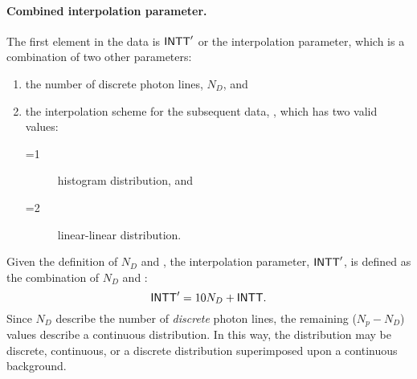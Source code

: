 \paragraph{Combined interpolation parameter.}\label{par:INTT}
The first element in the data is $\textsf{INTT}'$ or the interpolation parameter, which is a combination of two other parameters:
\begin{enumerate}
  \item the number of discrete photon lines, $N_{D}$, and
  \item the interpolation scheme for the subsequent data, , which has two valid values:
    \begin{description}
      \item[=1] histogram distribution, and
      \item[=2] linear-linear distribution.
    \end{description}
\end{enumerate}
Given the definition of $N_{D}$ and , the interpolation parameter, $\textsf{INTT}'$, is defined as the combination of $N_{D}$ and :
\begin{equation}
  \textsf{INTT}' = 10N_{D}+\textsf{INTT}.
  \label{eq::INTT'}
\end{equation}
Since $N_D$ describe the number of \emph{discrete} photon lines, the remaining ($N_{p}-N_{D}$) values describe a continuous distribution. In this way, the distribution may be discrete, continuous, or a discrete distribution superimposed upon a continuous background.

